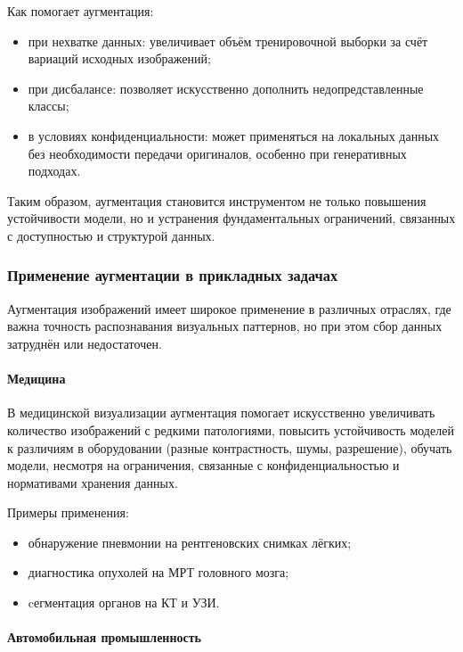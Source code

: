 Как помогает аугментация:

\begin{itemize}
	\item при нехватке данных: увеличивает объём тренировочной выборки за счёт вариаций исходных изображений;
	\item при дисбалансе: позволяет искусственно дополнить недопредставленные классы;
	\item в условиях конфиденциальности: может применяться на локальных данных без необходимости передачи оригиналов, особенно при генеративных подходах.
\end{itemize}

Таким образом, аугментация становится инструментом не только повышения устойчивости модели, но и устранения фундаментальных ограничений, связанных с доступностью и структурой данных.

\subsubsection{Применение аугментации в прикладных задачах}

Аугментация изображений имеет широкое применение в различных отраслях, где важна точность распознавания визуальных паттернов, но при этом сбор данных затруднён или недостаточен.

\paragraph{Медицина}

В медицинской визуализации аугментация помогает искусственно увеличивать количество изображений с редкими патологиями, повысить устойчивость моделей к различиям в оборудовании (разные контрастность, шумы, разрешение), обучать модели, несмотря на ограничения, связанные с конфиденциальностью и нормативами хранения данных.

Примеры применения:

\begin{itemize}
	\item обнаружение пневмонии на рентгеновских снимках лёгких;
	\item диагностика опухолей на МРТ головного мозга;
	\item cегментация органов на КТ и УЗИ.
\end{itemize}

\paragraph{Автомобильная промышленность}

